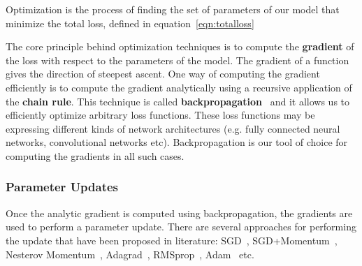 Optimization is the process of finding the set of parameters of our model that minimize the total loss, defined in equation~\ref{eqn:totalloss}

The core principle behind optimization techniques is to compute the \textbf{gradient} of the loss with respect to the parameters of the model. The gradient of a function gives the direction of steepest ascent. One way of computing the gradient efficiently is to compute the gradient analytically using a recursive application of the \textbf{chain rule}. This technique is called \textbf{backpropagation}~\cite{lecun2012efficient} and it allows us to efficiently optimize arbitrary loss functions. These loss functions  may be expressing different kinds of network architectures (e.g. fully connected neural networks, convolutional networks etc). Backpropagation is our tool of choice for computing the gradients in all such cases.  

\subsubsection{Parameter Updates}
\label{subsubsec:parameterupdates}
   
Once the analytic gradient is computed using backpropagation, the gradients are used to perform a parameter update. There are several approaches for performing the update that have been proposed in literature: SGD~\cite{bottou2010large}, SGD+Momentum~\cite{qian1999momentum, sutskever2013importance}, Nesterov Momentum~\cite{nesterov1983method}, Adagrad~\cite{duchi2011adaptive}, RMSprop~\cite{hinton2012neural}, Adam~\cite{kingma2014adam} etc.

